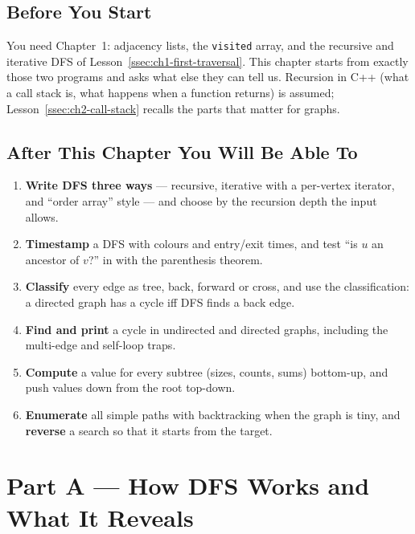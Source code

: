 \subsection*{Before You Start}

You need Chapter~1: adjacency lists, the \texttt{visited} array, and the recursive and iterative DFS of Lesson~\ref{ssec:ch1-first-traversal}. This chapter starts from exactly those two programs and asks what else they can tell us. Recursion in C++ (what a call stack is, what happens when a function returns) is assumed; Lesson~\ref{ssec:ch2-call-stack} recalls the parts that matter for graphs.

\subsection*{After This Chapter You Will Be Able To}
\begin{enumerate}[leftmargin=*]
    \item \textbf{Write DFS three ways} --- recursive, iterative with a per-vertex iterator, and ``order array'' style --- and choose by the recursion depth the input allows.
    \item \textbf{Timestamp} a DFS with colours and entry/exit times, and test ``is $u$ an ancestor of $v$?'' in  with the parenthesis theorem.
    \item \textbf{Classify} every edge as tree, back, forward or cross, and use the classification: a directed graph has a cycle iff DFS finds a back edge.
    \item \textbf{Find and print} a cycle in undirected and directed graphs, including the multi-edge and self-loop traps.
    \item \textbf{Compute} a value for every subtree (sizes, counts, sums) bottom-up, and push values down from the root top-down.
    \item \textbf{Enumerate} all simple paths with backtracking when the graph is tiny, and \textbf{reverse} a search so that it starts from the target.
\end{enumerate}

\chaptercontents

\section{Part A --- How DFS Works and What It Reveals}
\label{sec:ch2-lessons}






